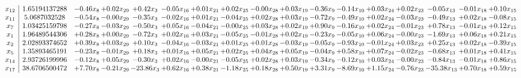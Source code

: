 \documentclass[9pt]{article}
\begin{document}
 \[\begin{array}{c| c c@{\hskip 2pt} c@{\hskip 2pt} c@{\hskip 2pt} c@{\hskip 2pt} c@{\hskip 2pt} c@{\hskip 2pt} c@{\hskip 2pt} c@{\hskip 2pt} c@{\hskip 2pt} c@{\hskip 2pt} c@{\hskip 2pt} c@{\hskip 2pt} c@{\hskip 2pt} c@{\hskip 2pt} c@{\hskip 2pt} }
 x_{12}   &  1.65194137288 & -0.46 x_{8} & +  0.02 x_{29} & +  0.42 x_{3} & -0.05 x_{16} & +  0.01 x_{21} & +  0.02 x_{25} & -0.00 x_{28} & +  0.03 x_{19} & -0.36 x_{9} & -0.14 x_{10} & +  0.03 x_{24} & +  0.02 x_{23} & -0.05 x_{13} & -0.01 x_{18} & +  0.10 x_{15}\\
 x_{11}   &  5.0687032528 & -0.54 x_{8} & -0.00 x_{29} & -0.35 x_{3} & -0.02 x_{16} & +  0.01 x_{21} & -0.04 x_{25} & +  0.02 x_{28} & +  0.03 x_{19} & -0.72 x_{9} & -0.49 x_{10} & +  0.02 x_{24} & -0.03 x_{23} & -0.49 x_{13} & +  0.02 x_{18} & -0.08 x_{15}\\
 x_{7}   &  1.03425159798 & -0.27 x_{8} & -0.03 x_{29} & -0.50 x_{3} & +  0.05 x_{16} & -0.04 x_{21} & -0.00 x_{25} & +  0.03 x_{28} & +  0.02 x_{19} & +  0.90 x_{9} & -0.16 x_{10} & +  0.02 x_{24} & -0.01 x_{23} & +  0.78 x_{13} & -0.01 x_{18} & +  0.12 x_{15}\\
 x_{1}   &  1.96489544306 & +  0.28 x_{8} & +  0.00 x_{29} & -0.72 x_{3} & +  0.02 x_{16} & +  0.03 x_{21} & -0.05 x_{25} & -0.01 x_{28} & +  0.02 x_{19} & -0.23 x_{9} & -0.05 x_{10} & +  0.06 x_{24} & -0.00 x_{23} & -1.69 x_{13} & +  0.06 x_{18} & +  0.21 x_{15}\\
 x_{2}   &  2.02893374652 & +  0.39 x_{8} & +  0.03 x_{29} & +  0.10 x_{3} & -0.04 x_{16} & -0.03 x_{21} & +  0.01 x_{25} & +  0.01 x_{28} & -0.03 x_{19} & -0.05 x_{9} & -0.93 x_{10} & -0.01 x_{24} & +  0.03 x_{23} & +  0.25 x_{13} & +  0.02 x_{18} & -0.39 x_{15}\\
 x_{5}   &  1.35893465191 & -0.23 x_{8} & -0.01 x_{29} & +  0.18 x_{3} & +  0.01 x_{16} & +  0.05 x_{21} & +  0.02 x_{25} & +  0.04 x_{28} & +  0.05 x_{19} & -0.04 x_{9} & +  0.58 x_{10} & +  0.07 x_{24} & -0.02 x_{23} & -0.68 x_{13} & +  0.01 x_{18} & +  0.41 x_{15}\\
 x_{14}   &  2.93726199996 & -0.12 x_{8} & +  0.05 x_{29} & -0.30 x_{3} & +  0.02 x_{16} & -0.00 x_{21} & -0.05 x_{25} & +  0.02 x_{28} & +  0.03 x_{19} & -0.34 x_{9} & -0.12 x_{10} & +  0.03 x_{24} & -0.00 x_{23} & -0.84 x_{13} & -0.01 x_{18} & +  0.86 x_{15}\\
 x_{17}   &  38.6706500472 & +  7.70 x_{8} & -0.21 x_{29} & -23.86 x_{3} & +  0.62 x_{16} & +  0.38 x_{21} & -1.18 x_{25} & +  0.18 x_{28} & +  0.50 x_{19} & +  3.31 x_{9} & -8.69 x_{10} & +  1.15 x_{24} & -0.76 x_{23} & -35.38 x_{13} & +  0.70 x_{18} & +  0.59 x_{15}\\

\end{array}\]
\end{document}
